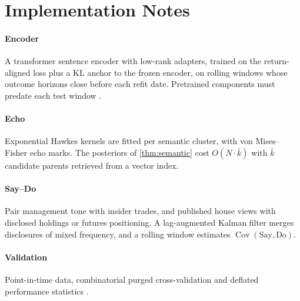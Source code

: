 \documentclass[11pt,a4paper]{article}
\theoremstyle{sci}
\theoremstyle{scidef}
\DeclareMathOperator{\Cov}{Cov}
\begin{document}
\section{Implementation Notes}\label{app:impl}

\paragraph{Encoder} A transformer sentence encoder \citep{reimers2019} with low-rank adapters, trained on the return-aligned loss plus a KL anchor to the frozen encoder, on rolling windows whose outcome horizons close before each refit date. Pretrained components must predate each test window \citep{glasserman2023}.

\paragraph{Echo} Exponential Hawkes kernels are fitted per semantic cluster, with von Mises--Fisher echo marks. The posteriors of \cref{thm:semantic} cost $O(N\cdot\bar k)$ with $\bar k$ candidate parents retrieved from a vector index.

\paragraph{Say--Do} Pair management tone with insider trades, and published house views with disclosed holdings or futures positioning. A lag-augmented Kalman filter merges disclosures of mixed frequency, and a rolling window estimates $\Cov(\text{Say},\text{Do})$.

\paragraph{Validation} Point-in-time data, combinatorial purged cross-validation and deflated performance statistics \citep{lopezdeprado2018,bailey2014dsr}.
\end{document}

